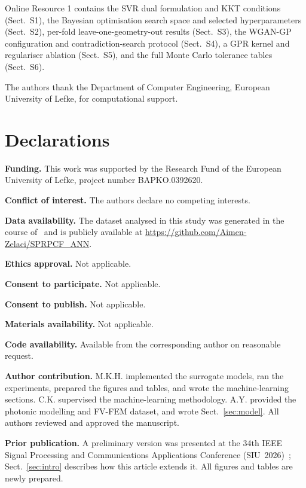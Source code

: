 \documentclass[iicol,pdflatex,sn-basic,Numbered]{sn-jnl}
\begin{document}

Online Resource 1 contains the SVR dual formulation and KKT conditions
(Sect.~S1), the Bayesian optimisation search space and selected hyperparameters
(Sect.~S2), per-fold leave-one-geometry-out results (Sect.~S3), the WGAN-GP
configuration and contradiction-search protocol (Sect.~S4), a GPR kernel and
regulariser ablation (Sect.~S5), and the full Monte Carlo tolerance tables
(Sect.~S6).


The authors thank the Department of Computer Engineering, European University of
Lefke, for computational support.

\section*{Declarations}

\textbf{Funding.} This work was supported by the Research Fund of the European
University of Lefke, project number BAPKO.0392620.

\textbf{Conflict of interest.} The authors declare no competing interests.

\textbf{Data availability.} The dataset analysed in this study was generated in
the course of~\cite{zelaci2021} and is publicly available at
\url{https://github.com/Aimen-Zelaci/SPRPCF\_ANN}.

\textbf{Ethics approval.} Not applicable.

\textbf{Consent to participate.} Not applicable.

\textbf{Consent to publish.} Not applicable.

\textbf{Materials availability.} Not applicable.

\textbf{Code availability.} Available from the corresponding author on reasonable
request.

\textbf{Author contribution.} M.K.H. implemented the surrogate models, ran the
experiments, prepared the figures and tables, and wrote the machine-learning
sections. C.K. supervised the machine-learning methodology. A.Y. provided the
photonic modelling and FV-FEM dataset, and wrote Sect.~\ref{sec:model}. All
authors reviewed and approved the manuscript.

\textbf{Prior publication.} A preliminary version was presented at the 34th IEEE
Signal Processing and Communications Applications Conference
(SIU~2026)~\cite{hammoud2026siu}; Sect.~\ref{sec:intro} describes how this
article extends it. All figures and tables are newly prepared.


\end{document}
